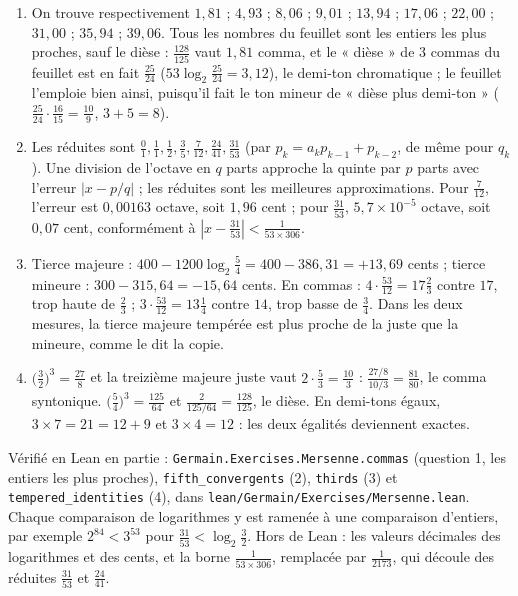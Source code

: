 \documentclass[11pt,a4paper]{article}
\begin{document}
\begin{solution}
\begin{enumerate}
\item On trouve respectivement $1{,}81$ ; $4{,}93$ ; $8{,}06$ ; $9{,}01$ ; $13{,}94$ ;
  $17{,}06$ ; $22{,}00$ ; $31{,}00$ ; $35{,}94$ ; $39{,}06$. Tous les nombres du
  feuillet sont les entiers les plus proches, sauf le dièse : $\frac{128}{125}$ vaut
  $1{,}81$ comma, et le « dièse » de $3$ commas du feuillet est en fait
  $\frac{25}{24}$ ($53\log_2\frac{25}{24} = 3{,}12$), le demi-ton chromatique ; le
  feuillet l'emploie bien ainsi, puisqu'il fait le ton mineur de « dièse plus
  demi-ton » ($\frac{25}{24}\cdot\frac{16}{15} = \frac{10}{9}$, $3 + 5 = 8$).
\item Les réduites sont $\frac01, \frac11, \frac12, \frac35, \frac{7}{12},
  \frac{24}{41}, \frac{31}{53}$ (par $p_k = a_kp_{k-1} + p_{k-2}$, de même pour
  $q_k$). Une division de l'octave en $q$ parts approche la quinte par $p$ parts
  avec l'erreur $|x - p/q|$ ; les réduites sont les meilleures approximations. Pour
  $\frac{7}{12}$, l'erreur est $0{,}00163$ octave, soit $1{,}96$ cent ; pour
  $\frac{31}{53}$, $5{,}7\times10^{-5}$ octave, soit $0{,}07$ cent, conformément à
  $|x - \frac{31}{53}| < \frac{1}{53\times 306}$.
\item Tierce majeure : $400 - 1200\log_2\frac54 = 400 - 386{,}31 = +13{,}69$ cents ;
  tierce mineure : $300 - 315{,}64 = -15{,}64$ cents. En commas : $4\cdot\frac{53}{12}
  = 17\frac23$ contre $17$, trop haute de $\frac23$ ; $3\cdot\frac{53}{12} =
  13\frac14$ contre $14$, trop basse de $\frac34$. Dans les deux mesures, la tierce
  majeure tempérée est plus proche de la juste que la mineure, comme le dit la
  copie.
\item $\bigl(\frac32\bigr)^3 = \frac{27}{8}$ et la treizième majeure juste vaut
  $2\cdot\frac53 = \frac{10}{3}$ : $\frac{27/8}{10/3} = \frac{81}{80}$, le comma
  syntonique. $\bigl(\frac54\bigr)^3 = \frac{125}{64}$ et $\frac{2}{125/64} =
  \frac{128}{125}$, le dièse. En demi-tons égaux, $3\times7 = 21 = 12 + 9$ et
  $3\times4 = 12$ : les deux égalités deviennent exactes.
\end{enumerate}

Vérifié en Lean en partie : \texttt{Germain.Exercises.Mersenne.commas} (question 1, les entiers
les plus proches), \texttt{fifth\_convergents} (2), \texttt{thirds} (3) et
\texttt{tempered\_identities} (4), dans \texttt{lean/Germain/Exercises/Mersenne.lean}. Chaque comparaison de logarithmes
y est ramenée à une comparaison d'entiers, par exemple $2^{84} < 3^{53}$ pour
$\frac{31}{53} < \log_2\frac32$. Hors de Lean : les valeurs décimales des logarithmes et des
cents, et la borne $\frac{1}{53 \times 306}$, remplacée par $\frac{1}{2173}$, qui découle des
réduites $\frac{31}{53}$ et $\frac{24}{41}$.
\end{solution}
\end{document}
